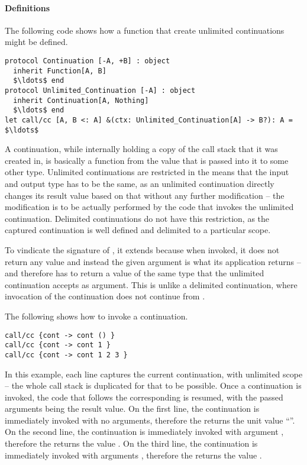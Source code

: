 \paragraph{Definitions}
The following code shows how a function that create unlimited continuations might be defined. 
\begin{lstlisting}
protocol Continuation [-A, +B] : object 
  inherit Function[A, B] 
  $\ldots$ end
protocol Unlimited_Continuation [-A] : object 
  inherit Continuation[A, Nothing] 
  $\ldots$ end
let call/cc [A, B <: A] &(ctx: Unlimited_Continuation[A] -> B?): A = $\ldots$
\end{lstlisting}

A continuation, while internally holding a copy of the call stack that it was created in, is basically a function from the value that is passed into it to some other type. Unlimited continuations are restricted in the means that the input and output type has to be the same, as an unlimited continuation directly changes its result value based on that without any further modification -- the modification is to be actually performed by the code that invokes the unlimited continuation. Delimited continuations do not have this restriction, as the captured continuation is well defined and delimited to a particular scope. 

To vindicate the signature of , it extends  because when invoked, it does not return any value and instead the given argument is what its  application returns -- and therefore  has to return a value of the same type that the unlimited continuation accepts as argument. This is unlike a delimited continuation, where invocation of the continuation does not continue from . 

\example The following shows how to invoke a continuation. 
\begin{lstlisting}
call/cc {cont -> cont () }
call/cc {cont -> cont 1 }
call/cc {cont -> cont 1 2 3 }
\end{lstlisting}
In this example, each line captures the current continuation, with unlimited scope -- the whole call stack is duplicated for that to be possible. Once a continuation is invoked, the code that follows the corresponding  is resumed, with the passed arguments being the result value. On the first line, the continuation is immediately invoked with no arguments, therefore the  returns the unit value ``\code{()}''. On the second line, the continuation is immediately invoked with argument , therefore the  returns the value . On the third line, the continuation is immediately invoked with arguments , therefore the  returns the value . 


